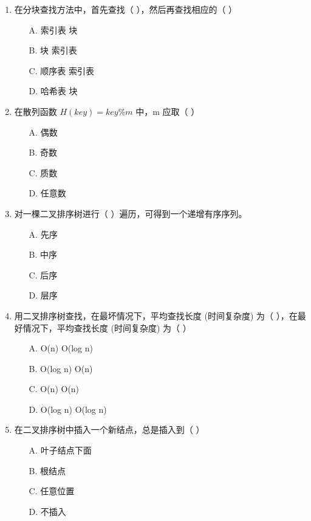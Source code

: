 \documentclass[12pt, a4paper]{article}
\begin{document}
\begin{enumerate}[label=\arabic*.]
	\item 在分块查找方法中，首先查找（ ），然后再查找相应的（ ）
	      \begin{enumerate}
		      \item[A.] 索引表 块
		      \item[B.] 块 索引表
		      \item[C.] 顺序表 索引表
		      \item[D.] 哈希表 块
	      \end{enumerate}

	\item 在散列函数 $H(key)=key \% m$ 中，m 应取（ ）
	      \begin{enumerate}
		      \item[A.] 偶数
		      \item[B.] 奇数
		      \item[C.] 质数
		      \item[D.] 任意数
	      \end{enumerate}

	\item 对一棵二叉排序树进行（ ）遍历，可得到一个递增有序序列。
	      \begin{enumerate}
		      \item[A.] 先序
		      \item[B.] 中序
		      \item[C.] 后序
		      \item[D.] 层序
	      \end{enumerate}

	\item 用二叉排序树查找，在最坏情况下，平均查找长度 (时间复杂度) 为（ ），在最好情况下，平均查找长度 (时间复杂度) 为（ ）
	      \begin{enumerate}
		      \item[A.] O(n) O(log n)
		      \item[B.] O(log n) O(n)
		      \item[C.] O(n) O(n)
		      \item[D.] O(log n) O(log n)
	      \end{enumerate}

	\item 在二叉排序树中插入一个新结点，总是插入到（ ）
	      \begin{enumerate}
		      \item[A.] 叶子结点下面
		      \item[B.] 根结点
		      \item[C.] 任意位置
		      \item[D.] 不插入
	      \end{enumerate}


\end{enumerate}
\end{document}
